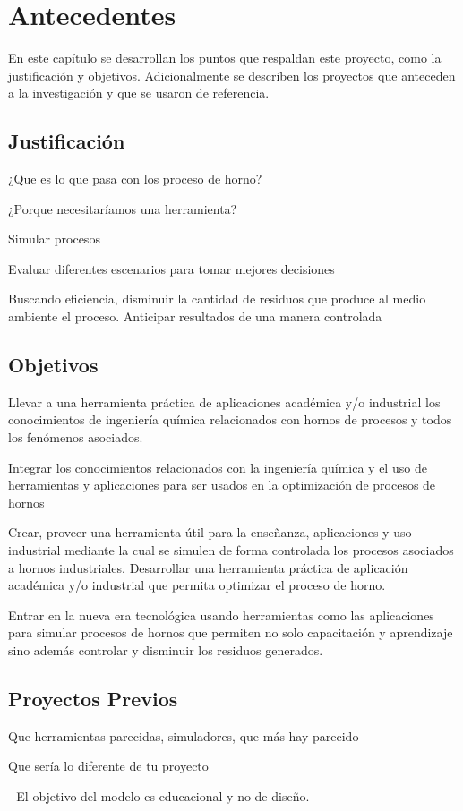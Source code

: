 \chapter{Antecedentes}

\par En este capítulo se desarrollan los puntos que respaldan este proyecto, como la justificación y objetivos. Adicionalmente se describen los proyectos que anteceden a la investigación y que se usaron de referencia.

\section{Justificación}

¿Que es lo que pasa con los proceso de horno?

¿Porque necesitaríamos una herramienta?

\par Simular procesos
\par Evaluar diferentes escenarios para tomar mejores decisiones

Buscando eficiencia, disminuir la cantidad de residuos que produce al medio ambiente el proceso. Anticipar resultados de una manera controlada

\section{Objetivos}

\par Llevar a una herramienta práctica de aplicaciones académica y/o industrial los conocimientos de ingeniería química relacionados con hornos de procesos y todos los fenómenos asociados.

Integrar los conocimientos relacionados con la ingeniería química y el uso de  herramientas y aplicaciones para ser usados en la optimización de procesos de hornos

Crear, proveer una herramienta útil para la enseñanza, aplicaciones y uso industrial mediante la cual se simulen de forma controlada los procesos  asociados a hornos industriales.
Desarrollar una herramienta práctica de aplicación académica y/o industrial que permita optimizar el proceso de horno.

Entrar en la nueva era tecnológica usando herramientas como las aplicaciones para simular procesos de hornos que permiten no solo capacitación y aprendizaje sino además controlar y disminuir los residuos generados.

\section{Proyectos Previos}

Que herramientas parecidas, simuladores, que más hay parecido

Que sería lo diferente de tu proyecto

- El objetivo del modelo es educacional y no de diseño.
